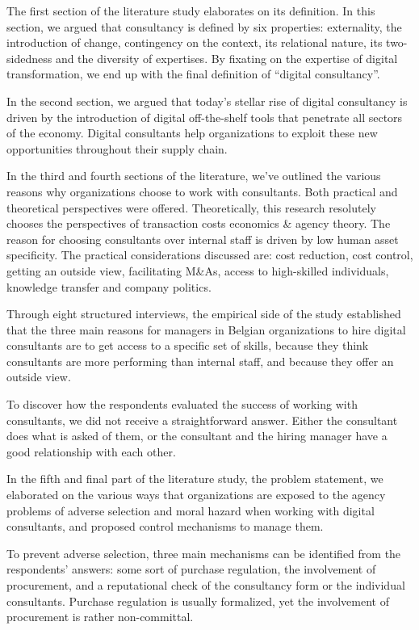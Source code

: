 \documentclass[
  man,floatsintext]{apa6}
\begin{document}
The first section of the literature study elaborates on its definition. In this section, we argued that consultancy is defined by six properties: externality, the introduction of change, contingency on the context, its relational nature, its two-sidedness and the diversity of expertises. By fixating on the expertise of digital transformation, we end up with the final definition of ``digital consultancy''.

In the second section, we argued that today's stellar rise of digital consultancy is driven by the introduction of digital off-the-shelf tools that penetrate all sectors of the economy. Digital consultants help organizations to exploit these new opportunities throughout their supply chain.

In the third and fourth sections of the literature, we've outlined the various reasons why organizations choose to work with consultants. Both practical and theoretical perspectives were offered. Theoretically, this research resolutely chooses the perspectives of transaction costs economics \& agency theory. The reason for choosing consultants over internal staff is driven by low human asset specificity. The practical considerations discussed are: cost reduction, cost control, getting an outside view, facilitating M\&As, access to high-skilled individuals, knowledge transfer and company politics.

Through eight structured interviews, the empirical side of the study established that the three main reasons for managers in Belgian organizations to hire digital consultants are to get access to a specific set of skills, because they think consultants are more performing than internal staff, and because they offer an outside view.

To discover how the respondents evaluated the success of working with consultants, we did not receive a straightforward answer. Either the consultant does what is asked of them, or the consultant and the hiring manager have a good relationship with each other.

In the fifth and final part of the literature study, the problem statement, we elaborated on the various ways that organizations are exposed to the agency problems of adverse selection and moral hazard when working with digital consultants, and proposed control mechanisms to manage them.

To prevent adverse selection, three main mechanisms can be identified from the respondents' answers: some sort of purchase regulation, the involvement of procurement, and a reputational check of the consultancy form or the individual consultants. Purchase regulation is usually formalized, yet the involvement of procurement is rather non-committal.
\end{document}
